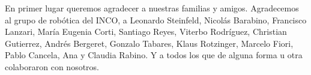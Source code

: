 
\begin{acknowledgments}

En primer lugar queremos agradecer a nuestras familias y amigos. Agradecemos al grupo de robótica del INCO, a Leonardo Steinfeld, Nicolás Barabino, Francisco Lanzari, María Eugenia Corti, Santiago Reyes, Viterbo Rodríguez, Christian Gutierrez, Andrés Bergeret, Gonzalo Tabares, Klaus Rotzinger, Marcelo Fiori, Pablo Cancela, Ana y Claudia Rabino. Y a todos los que de alguna forma u otra colaboraron con nosotros.

\end{acknowledgments}